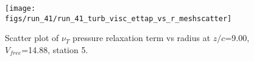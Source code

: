 \begin{figure}[H]
\centering
\texttt{[image: figs/run\_41/run\_41\_turb\_visc\_ettap\_vs\_r\_meshscatter]}
\caption{Scatter plot of $\nu_T$ pressure relaxation term vs radius at $z/c$=9.00, $V_{free}$=14.88, station 5.}
\label{fig:run_41_turb_visc_ettap_vs_r_meshscatter}
\end{figure}


